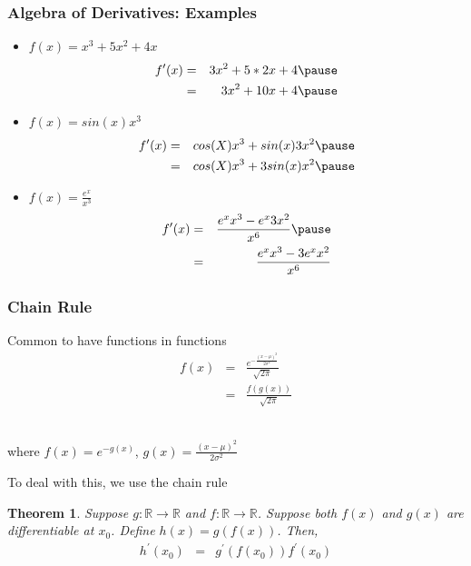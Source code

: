 \documentclass[aspectratio=169, handout]{beamer}
\newtheorem{thm}{Theorem}
\numberwithin{equation}{section}
\begin{document}
\begin{frame}
\frametitle{Algebra of Derivatives: Examples}

\begin{itemize}
\item[1)] $f(x)= x^3 + 5 x^2  + 4 x$ \pause
\begin{eqnarray}
f'(x) & = & 3 x^2 + 5 * 2x + 4 \nonumber \pause \\
      & = & 3 x^2 + 10x + 4 \nonumber \pause
\end{eqnarray}
     
\end{itemize}

\begin{itemize}
\item[2)] $f(x) = sin(x) x^3$ \pause
\begin{eqnarray}
f'(x) & = & cos(X)  x^3 + sin(x)  3 x^2 \nonumber \pause \\
& = & cos(X)  x^3 + 3 sin(x)  x^2 \nonumber \pause
\end{eqnarray}
\end{itemize}

\begin{itemize}
\item[3)] $f(x) = \frac{e^{x} }{x^3}$ \pause
\begin{eqnarray}
f'(x) & = & \frac{e^{x}  x^{3} - e^{x}  3 x^{2} }{x^6} \nonumber \pause \\
& = & \frac{e^{x}  x^{3} - 3 e^{x} x^{2} }{x^6} \nonumber
\end{eqnarray}

\end{itemize}

\end{frame}



\begin{frame}
\frametitle{Chain Rule} 
Common to have functions in functions
\begin{eqnarray}
f(x) & = & \frac{e^{ - \frac{(x - \mu)^2}{2 \sigma^2}}}{\sqrt{2 \pi }  } \nonumber \\
		& = & \frac{f (g(x)) } {\sqrt{2 \pi}} \nonumber 
\end{eqnarray}

\ \\where $f(x) = e ^{- g(x)}$, $g(x) = \frac{(x - \mu)^2}{2 \sigma^2}$ \pause

To deal with this, we use the \alert{chain rule} \pause

\begin{thm} 
Suppose $g: \mathbb{R} \rightarrow \mathbb{R}$ and $f: \mathbb{R} \rightarrow \mathbb{R}$. Suppose both $f(x)$ and $g(x)$ are differentiable at $x_{0}$.  Define $h(x) = g(f(x))$.  Then, 
\begin{eqnarray}
h^{'}(x_{0}) & = & g^{'}(f(x_{0}))f^{'}(x_{0}) \nonumber 
\end{eqnarray}
\end{thm}

\end{frame}
\end{document}
